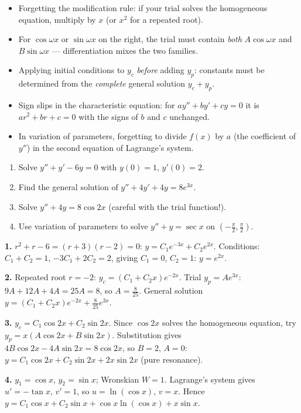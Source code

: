\documentclass[11pt]{article}
\begin{document}
\begin{attention}
\begin{itemize}
\item Forgetting the modification rule: if your trial solves the homogeneous equation, multiply by $x$ (or $x^{2}$ for a repeated root).
\item For $\cos\omega x$ or $\sin\omega x$ on the right, the trial must contain \emph{both} $A\cos\omega x$ and $B\sin\omega x$ — differentiation mixes the two families.
\item Applying initial conditions to $y_{c}$ \emph{before} adding $y_{p}$: constants must be determined from the \emph{complete} general solution $y_{c}+y_{p}$.
\item Sign slips in the characteristic equation: for $ay''+by'+cy=0$ it is $ar^{2}+br+c=0$ with the signs of $b$ and $c$ unchanged.
\item In variation of parameters, forgetting to divide $f(x)$ by $a$ (the coefficient of $y''$) in the second equation of Lagrange's system.
\end{itemize}
\end{attention}

\begin{exercice}[Practice]
\begin{enumerate}
\item Solve $y''+y'-6y=0$ with $y(0)=1$, $y'(0)=2$.
\item Find the general solution of $y''+4y'+4y=8e^{3x}$.
\item Solve $y''+4y=8\cos 2x$ (careful with the trial function!).
\item Use variation of parameters to solve $y''+y=\sec x$ on $\left(-\tfrac{\pi}{2},\tfrac{\pi}{2}\right)$.
\end{enumerate}
\end{exercice}

\begin{corrige}[Exercise 1]
\textbf{1.} $r^{2}+r-6=(r+3)(r-2)=0$: $y=C_{1}e^{-3x}+C_{2}e^{2x}$. Conditions: $C_{1}+C_{2}=1$, $-3C_{1}+2C_{2}=2$, giving $C_{1}=0$, $C_{2}=1$: $y=e^{2x}$.

\textbf{2.} Repeated root $r=-2$: $y_{c}=(C_{1}+C_{2}x)e^{-2x}$. Trial $y_{p}=Ae^{3x}$: $9A+12A+4A=25A=8$, so $A=\tfrac{8}{25}$. General solution $y=(C_{1}+C_{2}x)e^{-2x}+\tfrac{8}{25}e^{3x}$.

\textbf{3.} $y_{c}=C_{1}\cos 2x+C_{2}\sin 2x$. Since $\cos 2x$ solves the homogeneous equation, try $y_{p}=x(A\cos 2x+B\sin 2x)$. Substitution gives $4B\cos 2x-4A\sin 2x=8\cos 2x$, so $B=2$, $A=0$: $y=C_{1}\cos 2x+C_{2}\sin 2x+2x\sin 2x$ (pure resonance).

\textbf{4.} $y_{1}=\cos x$, $y_{2}=\sin x$; Wronskian $W=1$. Lagrange's system gives $u'=-\tan x$, $v'=1$, so $u=\ln(\cos x)$, $v=x$. Hence $y=C_{1}\cos x+C_{2}\sin x+\cos x\ln(\cos x)+x\sin x$.
\end{corrige}
\end{document}
